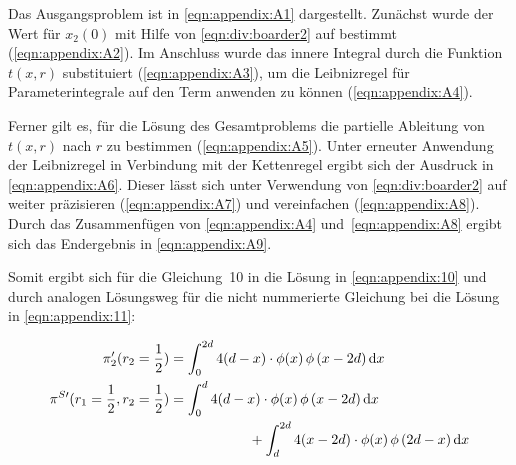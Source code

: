 Das Ausgangsproblem ist in \cref{eqn:appendix:A1} dargestellt. Zunächst wurde der Wert für $x_2(0)$ mit Hilfe von \cref{eqn:div:boarder2} auf  bestimmt (\cref{eqn:appendix:A2}). Im Anschluss wurde das innere Integral durch die Funktion $t(x,r)$ substituiert (\cref{eqn:appendix:A3}), um die Leibnizregel für Parameterintegrale auf den Term anwenden zu können (\cref{eqn:appendix:A4}).

Ferner gilt es, für die Lösung des Gesamtproblems die partielle Ableitung von $t(x,r)$ nach $r$ zu bestimmen (\cref{eqn:appendix:A5}). Unter erneuter Anwendung der Leibnizregel in Verbindung mit der Kettenregel ergibt sich der Ausdruck in \cref{eqn:appendix:A6}. Dieser lässt sich unter Verwendung von \cref{eqn:div:boarder2} auf  weiter präzisieren (\cref{eqn:appendix:A7}) und vereinfachen (\cref{eqn:appendix:A8}). Durch das Zusammenfügen von \cref{eqn:appendix:A4} und~\cref{eqn:appendix:A8} ergibt sich das Endergebnis in \cref{eqn:appendix:A9}.

Somit ergibt sich für die Gleichung~10 in \textcite[\pno~378(6)]{Wagner-2010} die Lösung in \cref{eqn:appendix:10} und durch analogen Lösungsweg für die nicht nummerierte Gleichung bei \textcite[\pno~379(7)]{Wagner-2010} die Lösung in \cref{eqn:appendix:11}:

\begin{align}
	\pi'_2(r_2=\frac{1}{2})                        & = \int_0^{2d} 4(d-x) \cdot \phi(x)\,\phi\left(x-2d\right) \dd x                \label{eqn:appendix:10} \\
	\pi^{S\prime}(r_1=\frac{1}{2},r_2=\frac{1}{2}) & = \int_0^{d} 4(d-x) \cdot \phi(x)\,\phi\left(x-2d\right) \dd x                 \notag                  \\
	                                               & \hspace{2cm} + \int_d^{2d} 4(x-2d) \cdot \phi(x)\,\phi\left(2d-x\right) \dd x  \label{eqn:appendix:11}
\end{align}

